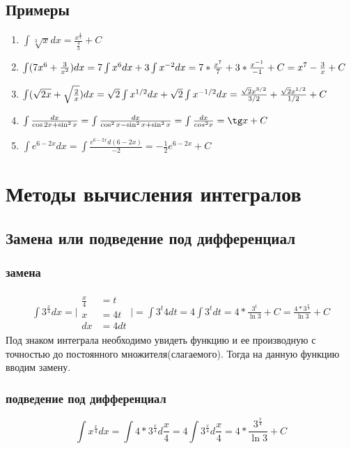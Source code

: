 \documentclass[12pt,a4paper]{article}
\begin{document}
\subsection{Примеры}
\begin{enumerate}[label=(\roman*), leftmargin=*, itemsep=0.4ex, before={\everymath{\displaystyle}}]%
\item{
$\int \sqrt[3]{x} dx = \frac{x^{\frac{4}{3}}}{\frac{4}{3}} + C$
}
\item{
$
\int (7x^6 + \frac{3}{x^2})dx = 7 \int x^6 dx + 3 \int x^{-2} dx
= 7 * \frac{x^7}{7} + 3 * \frac{x^{-1}}{-1} + C =\\ x^7 - \frac{3}{x} + C
$
}
\item{
$
\int (\sqrt{2x} + \sqrt{\frac{2}{x}})dx = \sqrt{2} \int x^{1/2}dx +
\sqrt{2} \int x^{-1/2}dx =\\ \frac{\sqrt{2} x^{3/2}}{3/2} +
\frac{\sqrt{2} x^{1/2}}{1/2} + C
$
}
\item{
$\int \frac{dx}{\cos 2x + \sin^2 x} =
\int \frac{dx}{\cos^2 x - \sin^2 x + \sin^2 x} =
\int \frac{dx}{cos^2 x} =
\tg x + C$
}
\item{
$
\int e^{6 - 2x} dx =
\int \frac{e^{6 - 2x}d(6 - 2x)}{-2} =
-\frac{1}{2} e^{6 - 2x} + C
$
}
\end{enumerate}
\clearpage
\section{Методы вычисления интегралов}
\subsection{Замена или подведение под дифференциал}
\subsubsection{замена}
\begin{align*}
\int 3^{\frac{x}{4}} dx = \Bigg|
\begin{split}
\frac{x}{4} & = t \\
x & = 4t \\
dx & = 4dt
\end{split}
\Bigg| = \int 3^t 4dt = 4 \int 3^t dt = 4 * \frac{3^t}{\ln 3} + C =
\frac{4 * 3^{\frac{x}{4}}}{\ln 3} + C
\end{align*}
Под знаком интеграла необходимо увидеть функцию и ее производную
с точностью до постоянного множителя(слагаемого).
Тогда на данную функцию вводим замену.
\subsubsection{подведение под дифференциал}
\[
\int x^{\frac{x}{4}} dx = \int 4 * 3^{\frac{x}{4}} d\frac{x}{4}
= 4 \int 3^{\frac{x}{4}} d\frac{x}{4} =
4 * \frac{3^{\frac{x}{4}}}{\ln 3} + C
\]
\end{document}
